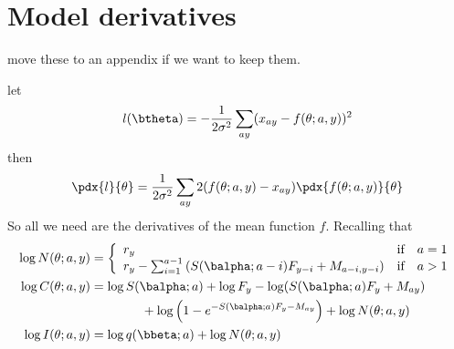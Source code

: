 \documentclass[a4paper,english]{article}
\begin{document}
\fi


\iffalse %

\section{Model derivatives}

move these to an appendix if we want to keep them.

let
\begin{align}
  l(\btheta) = -\frac{1}{2\sigma^2} \sum_{ay} (x_{ay} - f(\theta;a,y))^2
\end{align}
then
\begin{align}
  \pdx{l}{\theta} = \frac{1}{2\sigma^2} \sum_{ay} 2(f(\theta;a,y) - x_{ay}) \pdx{f(\theta;a,y)}{\theta}
\end{align}
So all we need are the derivatives of the mean function $f$.  Recalling that
\begin{align}
  \log N(\theta;a,y) &= 
  \left\lbrace 
    \begin{array}{ll}
      r_y & \text{if} \quad a = 1 \\
      r_y -\sum_{i=1}^{a-1} \left( S(\balpha;a-i)F_{y-i} + M_{a-i,y-i} \right) & \text{if} \quad a > 1
    \end{array} \right. \\
 \log C(\theta;a, y) &= \log S(\balpha;a) + \log F_y - \log(S(\balpha;a) F_y + M_{ay}) \\ 
 &\qquad \qquad + \log \left( 1 - e^{-S(\balpha;a)F_y - M_{ay}} \right)
           + \log N(\theta;a,y) \\
  \log I(\theta;a,y) &= \log q(\bbeta;a) + \log N(\theta;a,y)
\end{align}
\end{document}
